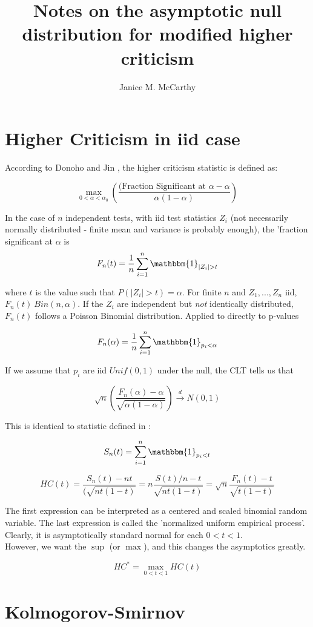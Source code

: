 \documentclass[11pt]{article}
\title{\sc Notes on the asymptotic null distribution for modified higher criticism}
\author{Janice M. McCarthy}
\begin{document}
\section{Higher Criticism in iid case}

According to Donoho and Jin \cite{HCHM}, the higher criticism statistic is defined as:

$$\max_{0<\alpha<\alpha_0}\left(
\frac{(\textrm{Fraction Significant at } \alpha - \alpha}{\alpha (1 - \alpha)}\right)$$

In the case of $n$ independent tests, with iid test statistics $Z_i$ (not necessarily normally distributed - finite mean and variance is probably enough), the 'fraction significant at $\alpha$ is
$$ F_n(t) = \frac1n \sum_{i=1}^n \mathbbm{1}_{|Z_i|>t}$$

where $t$ is the value such that $P(|Z_i|>t) =\alpha$. For finite $n$ and $Z_1,...,Z_n$ iid, $F_n(t) ~ Bin(n,\alpha)$. If the $Z_i$ are independent but \emph{not} identically distributed, $F_n(t)$ follows a Poisson Binomial distribution. Applied to directly to p-values

$$ F_n(\alpha) = \frac1n \sum_{i=1}^n \mathbbm{1}_{p_i < \alpha}$$

If we assume that $p_i$ are iid $Unif(0,1)$ under the null, the CLT tells us that 

$$\sqrt{n}\left(\frac{F_n(\alpha) - \alpha}{\sqrt{\alpha(1-\alpha)}}\right) \xrightarrow{d} N(0,1)$$

This is identical to statistic defined in \cite{Xihong}:

$$ S_n(t) = \sum_{i=1}^n \mathbbm{1}_{p_i < t}$$

$$HC(t) = \frac{S_n(t)-n t}{(\sqrt{nt(1-t)}} = n\frac{S(t)/n - t}{\sqrt{nt(1-t)}} 
=   \sqrt{n}\frac{F_n(t) - t}{\sqrt{t(1-t)}}$$

The first expression can be interpreted as a centered and scaled binomial random variable. The last expression is called the 'normalized uniform empirical process'. Clearly, it is asymptotically standard normal for each $0<t<1$.\\


However, we want the $\sup$ (or $\max$), and this changes the asymptotics greatly. 

$$HC^* = \max_{0<t<1} HC(t)$$

\section{Kolmogorov-Smirnov}
\end{document}
